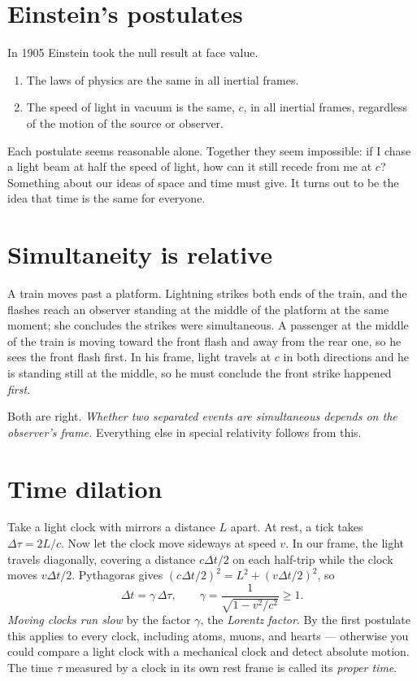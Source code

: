 \section{Einstein's postulates}

In 1905 Einstein took the null result at face value.
\begin{law}
\begin{enumerate}[label=(\arabic*),itemsep=2pt]
  \item The laws of physics are the same in all inertial frames.
  \item The speed of light in vacuum is the same, $c$, in all inertial frames, regardless of the motion of the source or observer.
\end{enumerate}
\end{law}
Each postulate seems reasonable alone. Together they seem impossible: if I chase a light beam at half the speed of light, how can it still recede from me at $c$? Something about our ideas of space and time must give. It turns out to be the idea that time is the same for everyone.

\section{Simultaneity is relative}

A train moves past a platform. Lightning strikes both ends of the train, and the flashes reach an observer standing at the middle of the platform at the same moment; she concludes the strikes were simultaneous. A passenger at the middle of the train is moving toward the front flash and away from the rear one, so he sees the front flash first. In his frame, light travels at $c$ in both directions and he is standing still at the middle, so he must conclude the front strike happened \emph{first}.

Both are right. \emph{Whether two separated events are simultaneous depends on the observer's frame.} Everything else in special relativity follows from this.

\section{Time dilation}

Take a light clock with mirrors a distance $L$ apart. At rest, a tick takes $\Delta\tau = 2L/c$. Now let the clock move sideways at speed $v$. In our frame, the light travels diagonally, covering a distance $c\Delta t/2$ on each half-trip while the clock moves $v\Delta t/2$. Pythagoras gives $(c\Delta t/2)^2 = L^2 + (v\Delta t/2)^2$, so
\[
  \Delta t = \gamma\,\Delta\tau, \qquad \gamma = \frac{1}{\sqrt{1 - v^2/c^2}} \ge 1 .
\]
\emph{Moving clocks run slow} by the factor $\gamma$, the \emph{Lorentz factor}. By the first postulate this applies to every clock, including atoms, muons, and hearts --- otherwise you could compare a light clock with a mechanical clock and detect absolute motion. The time $\tau$ measured by a clock in its own rest frame is called its \emph{proper time}.

